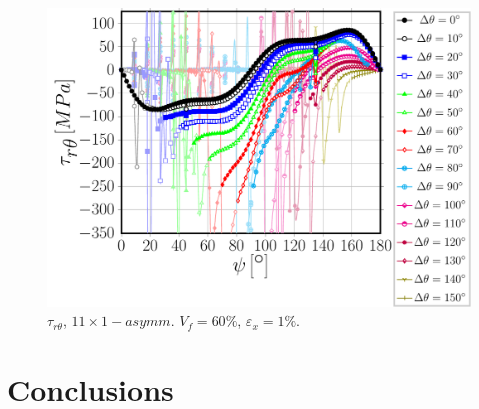 \documentclass[review]{elsarticle}
\begin{document}
\begin{figure}[!h]
\centering
\includegraphics[width=\textwidth]{S5A0asymm-circum-taurt.pdf}
\caption{$\tau_{r\theta}$, $11\times 1-asymm$. $V_{f}=60\%$, $\varepsilon_{x}=1\%$.}\label{}
\end{figure}

\section{Conclusions}
\end{document}
